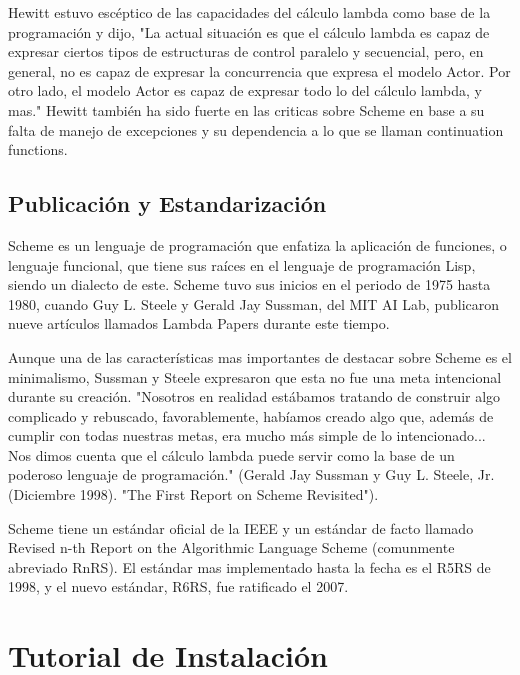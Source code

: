 \documentclass[11pt]{article} %
\begin{document}
Hewitt estuvo escéptico de las capacidades del cálculo lambda como base de la programación y dijo, "La actual situación es que el cálculo lambda es capaz de expresar ciertos tipos de estructuras de control paralelo y secuencial, pero, en general, no es capaz de expresar la concurrencia que expresa el modelo Actor. Por otro lado, el modelo Actor es capaz de expresar todo lo del cálculo lambda, y mas." Hewitt también ha sido fuerte en las criticas sobre Scheme en base a su falta de manejo de excepciones y su dependencia a lo que se llaman continuation functions.

\subsection{Publicación y Estandarización}

Scheme es un lenguaje de programación que enfatiza la aplicación de funciones, o lenguaje funcional, que tiene sus raíces en el lenguaje de programación Lisp, siendo un dialecto de este. Scheme tuvo sus inicios en el periodo de 1975 hasta 1980, cuando Guy L. Steele y Gerald Jay Sussman, del MIT AI Lab, publicaron nueve artículos llamados Lambda Papers durante este tiempo.

Aunque una de las características mas importantes de destacar sobre Scheme es el minimalismo, Sussman y Steele expresaron que esta no fue una meta intencional durante su creación. "Nosotros en realidad estábamos tratando de construir algo complicado y rebuscado, favorablemente, habíamos creado algo que, además de cumplir con todas nuestras metas, era mucho más simple de lo intencionado... Nos dimos cuenta que el cálculo lambda puede servir como la base de un poderoso lenguaje de programación." (Gerald Jay Sussman y Guy L. Steele, Jr. (Diciembre 1998). "The First Report on Scheme Revisited").

Scheme tiene un estándar oficial de la IEEE y un estándar de facto llamado Revised n-th Report on the Algorithmic Language Scheme (comunmente abreviado RnRS). El estándar mas implementado hasta la fecha es el R5RS de 1998, y el nuevo estándar, R6RS, fue ratificado el 2007.
\section{Tutorial de Instalación}
\end{document}
